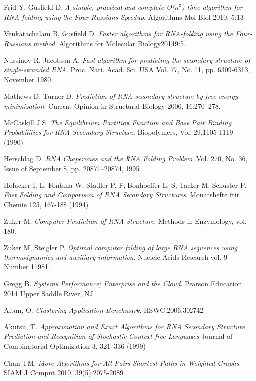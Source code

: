\documentclass[12pt]{article}
\begin{document}
\begin{thebibliography}{56}
Frid Y, Gusfield D.
\textit{A simple, practical and complete O($n^3$)-time
algorithm for RNA folding using the Four-Russians Speedup}.
Algorithms Mol Biol 2010, 5:13

Venkatachalam B, Gusfield D.
\textit{Faster algorithms for RNA-folding using the Four-Russians method}.
Algorithms for Molecular Biology20149:5.

Nussinov R, Jacobson A.
\textit{Fast algorithm for predicting the secondary structure of
single-stranded RNA}.
Proc. Nati. Acad. Sci. USA Vol. 77, No. 11, pp. 6309-6313, November 1980.

Mathews D, Turner D.
\textit{Prediction of RNA secondary structure by free energy
minimization}.
Current Opinion in Structural Biology 2006, 16:270–278.

McCaskill J.S.
\textit{The Equilibrium Partition Function and Base Pair
Binding Probabilities for RNA Secondary Structure.}
Biopolymers, Vol. 29,1105-1119 (1990)

Herschlag D.
\textit{RNA Chaperones and the RNA Folding Problem}.
Vol. 270, No. 36, Issue of September 8, pp. 20871–20874, 1995

Hofacker I. L, Fontana W, Stadler P. F, Bonhoeffer L. S, Tacker M, Schuster P.
\textit{Fast Folding and Comparison of RNA Secondary Structures}.
Monatshefte ftir Chemie 125, 167-188 (1994)

Zuker M.
\textit{Computer Prediction of RNA Structure}.
Methods in Enzymology, vol. 180.

Zuker M, Steigler P.
\textit{Optimal computer folding of large RNA sequences using thermodynamics and auxiliary information}.
Nucleic Acids Research vol. 9 Number 11981.

Gregg B.
\textit{Systems Performance; Enterprise and the Cloud}.
Pearson Education 2014 Upper Saddle River, NJ

Altun, O.
\textit{Clustering Application Benchmark}.
IISWC.2006.302742

Akutsu, T.
\textit{Approximation and Exact Algorithms for RNA
Secondary Structure Prediction and Recognition
of Stochastic Context-free Languages}
Journal of Combinatorial Optimization 3, 321–336 (1999)

Chan TM.
\textit{More Algorithms for All-Pairs Shortest Paths in Weighted
Graphs}.
SIAM J Comput 2010, 39(5):2075-2089


\end{thebibliography}
\end{document}
